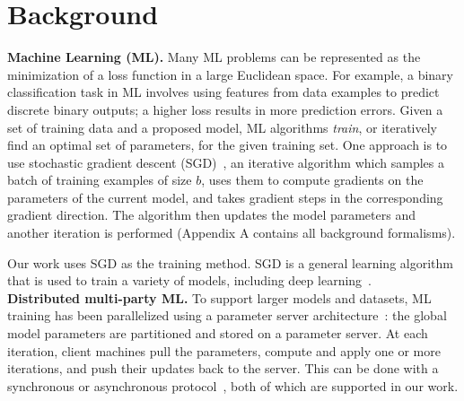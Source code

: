 \chapter{Background}
\label{sec:background}

\noindent \textbf{Machine Learning (ML).} 
%
Many ML problems can be represented as the minimization of a loss
function in a large Euclidean space. For example, a binary
classification task in ML involves using features from data examples to
predict discrete binary outputs; a higher loss results in more
prediction errors. Given a set of training data and a proposed model, ML
algorithms \emph{train}, or iteratively find an optimal set of
parameters, for the given training set. One approach is to use
stochastic gradient descent (SGD)~\cite{Bottou:2010}, an iterative
algorithm which samples a batch of training examples of size $b$, uses
them to compute gradients on the parameters of the current model, and
takes gradient steps in the corresponding gradient direction. The
algorithm then updates the model parameters and another iteration is
performed (Appendix A contains all background formalisms).

Our work uses SGD as the training method. SGD is a
general learning algorithm that is used to train a variety
of models, including deep learning~\cite{Song:2013}.\\

\noindent \textbf{Distributed multi-party ML.}
%
To support larger models and datasets, ML training has been
parallelized using a parameter server architecture~\cite{Li:2014}: the
global model parameters are partitioned and stored on a parameter
server. At each iteration, client machines pull the 
parameters, compute and apply one or more iterations, and push their
updates back to the server. This can be done
with a synchronous or asynchronous protocol~\cite{Hsieh:2017,
Recht:2011}, both of which are supported in our work.

